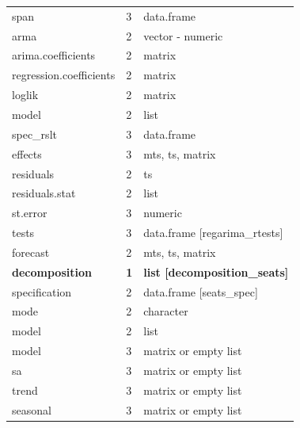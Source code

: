 \documentclass[article]{jss}
\begin{document}
\begin{longtable}[t]{lll}
\hspace{3em}span & 3 & data.frame\\
\addlinespace
\hspace{2em}arma & 2 & vector - numeric\\
\hspace{2em}arima.coefficients & 2 & matrix\\
\hspace{2em}regression.coefficients & 2 & matrix\\
\hspace{2em}loglik & 2 & matrix\\
\hspace{2em}model & 2 & \vphantom{1} list\\
\addlinespace
\hspace{3em}spec\_rslt & 3 & data.frame\\
\hspace{3em}effects & 3 & mts, ts, matrix\\
\hspace{2em}residuals & 2 & ts\\
\hspace{2em}residuals.stat & 2 & list\\
\hspace{3em}st.error & 3 & numeric\\
\addlinespace
\hspace{3em}tests & 3 & data.frame [regarima\_rtests]\\
\hspace{2em}forecast & 2 & mts, ts, matrix\\
\textbf{\hspace{1em}decomposition} & \textbf{1} & \textbf{list [decomposition\_seats]}\\
\hspace{2em}specification & 2 & data.frame [seats\_spec]\\
\hspace{2em}mode & 2 & character\\
\addlinespace
\hspace{2em}model & 2 & list\\
\hspace{3em}model & 3 & matrix or empty list\\
\hspace{3em}sa & 3 & matrix or empty list\\
\hspace{3em}trend & 3 & matrix or empty list\\
\hspace{3em}seasonal & 3 & matrix or empty list\\

\end{longtable}
\end{document}
